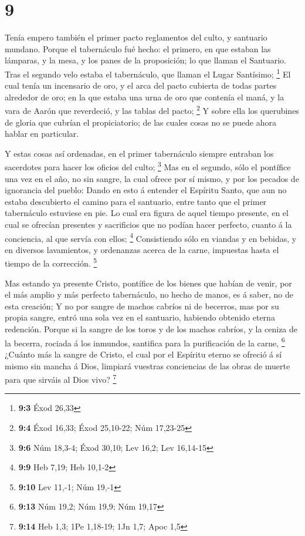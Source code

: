 \hypertarget{section-8}{%
\section{9}\label{section-8}}

 Tenía empero también el primer pacto reglamentos del culto,
y santuario mundano.  Porque el tabernáculo fué hecho: el
primero, en que estaban las lámparas, y la mesa, y los panes de la
proposición; lo que llaman el Santuario.  Tras el segundo
velo estaba el tabernáculo, que llaman el Lugar Santísimo; \footnote{\textbf{9:3}
  Éxod 26,33}  El cual tenía un incensario de oro, y el arca
del pacto cubierta de todas partes alrededor de oro; en la que estaba
una urna de oro que contenía el maná, y la vara de Aarón que reverdeció,
y las tablas del pacto; \footnote{\textbf{9:4} Éxod 16,33; Éxod
  25,10-22; Núm 17,23-25}  Y sobre ella los querubines de
gloria que cubrían el propiciatorio; de las cuales cosas no se puede
ahora hablar en particular.

 Y estas cosas así ordenadas, en el primer tabernáculo
siempre entraban los sacerdotes para hacer los oficios del culto;
\footnote{\textbf{9:6} Núm 18,3-4; Éxod 30,10; Lev 16,2; Lev 16,14-15}
 Mas en el segundo, sólo el pontífice una vez en el año, no
sin sangre, la cual ofrece por sí mismo, y por los pecados de ignorancia
del pueblo:  Dando en esto á entender el Espíritu Santo, que
aun no estaba descubierto el camino para el santuario, entre tanto que
el primer tabernáculo estuviese en pie.  Lo cual era figura
de aquel tiempo presente, en el cual se ofrecían presentes y sacrificios
que no podían hacer perfecto, cuanto á la conciencia, al que servía con
ellos; \footnote{\textbf{9:9} Heb 7,19; Heb 10,1-2} 
Consistiendo sólo en viandas y en bebidas, y en diversos lavamientos, y
ordenanzas acerca de la carne, impuestas hasta el tiempo de la
corrección. \footnote{\textbf{9:10} Lev 11,-1; Núm 19,-1}

 Mas estando ya presente Cristo, pontífice de los bienes
que habían de venir, por el más amplio y más perfecto tabernáculo, no
hecho de manos, es á saber, no de esta creación;  Y no por
sangre de machos cabríos ni de becerros, mas por su propia sangre, entró
una sola vez en el santuario, habiendo obtenido eterna redención.
 Porque si la sangre de los toros y de los machos cabríos,
y la ceniza de la becerra, rociada á los inmundos, santifica para la
purificación de la carne, \footnote{\textbf{9:13} Núm 19,2; Núm 19,9;
  Núm 19,17}  ¿Cuánto más la sangre de Cristo, el cual por
el Espíritu eterno se ofreció á sí mismo sin mancha á Dios, limpiará
vuestras conciencias de las obras de muerte para que sirváis al Dios
vivo? \footnote{\textbf{9:14} Heb 1,3; 1Pe 1,18-19; 1Jn 1,7; Apoc 1,5}

